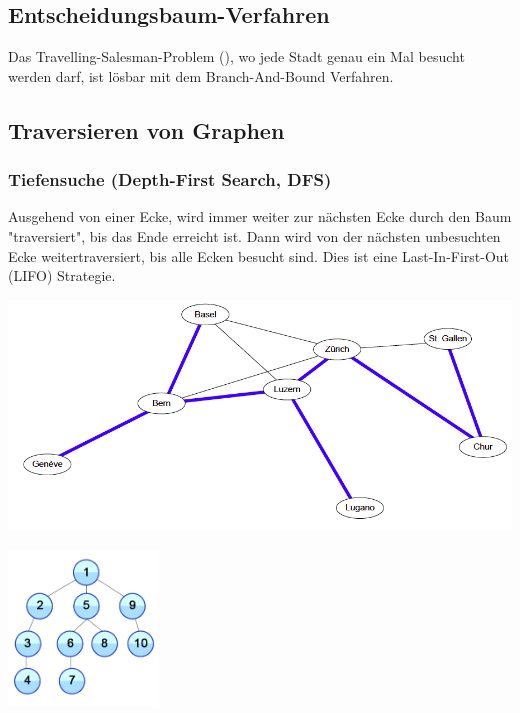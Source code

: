 \subsection{Entscheidungsbaum-Verfahren }
	Das Travelling-Salesman-Problem (), wo jede Stadt genau ein Mal besucht werden darf, ist lösbar mit dem Branch-And-Bound Verfahren.


\subsection{Traversieren von Graphen }

\begin{minipage}{0.5\textwidth}
	\subsubsection{Tiefensuche (Depth-First Search, DFS)}
		Ausgehend von einer Ecke, wird immer weiter zur nächsten Ecke durch den Baum "traversiert", bis das Ende erreicht ist. Dann wird von der nächsten unbesuchten Ecke weitertraversiert, bis alle Ecken besucht sind. Dies ist eine Last-In-First-Out (LIFO) Strategie.
		
		\includegraphics[width=\textwidth]{Content/Graphen/DFS.png}
		\begin{center}\includegraphics[width=0.3\textwidth]{Content/Graphen/tiefensuche.png}\end{center}
\end{minipage}
